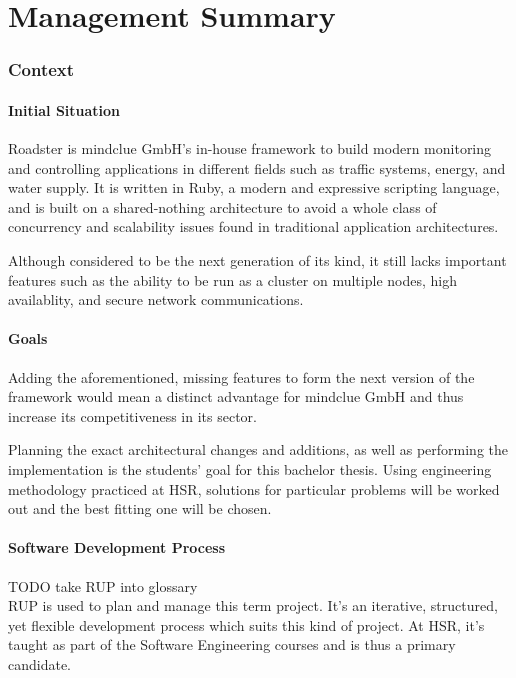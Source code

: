 \part*{Management Summary}\label{part:mgmtsummary}
\setcounter{secnumdepth}{0} %

\section*{Context}
\subsection*{Initial Situation}
Roadster is mindclue GmbH's in-house framework to build modern monitoring and
controlling applications in different fields such as traffic systems, energy,
and water supply. It is written in Ruby, a modern and expressive scripting
language, and is built on a shared-nothing architecture to avoid a whole class
of concurrency and scalability issues found in traditional application
architectures.

Although considered to be the next generation of its kind, it still lacks
important features such as the ability to be run as a cluster on multiple
nodes, high availablity, and secure network communications.

\subsection{Goals}
Adding the aforementioned, missing features to form the next version of the
framework would mean a distinct advantage for mindclue GmbH and thus increase
its competitiveness in its sector.

Planning the exact architectural changes and additions, as well as performing
the implementation is the students' goal for this bachelor thesis. Using
engineering methodology practiced at HSR, solutions for particular problems
will be worked out and the best fitting one will be chosen.

\subsection*{Software Development Process}
TODO take RUP into glossary\\

RUP is used to plan and manage this term project. It’s an iterative,
structured, yet flexible development process which suits this kind of project.
At HSR, it’s taught as part of the Software Engineering courses and is thus a
primary candidate.

